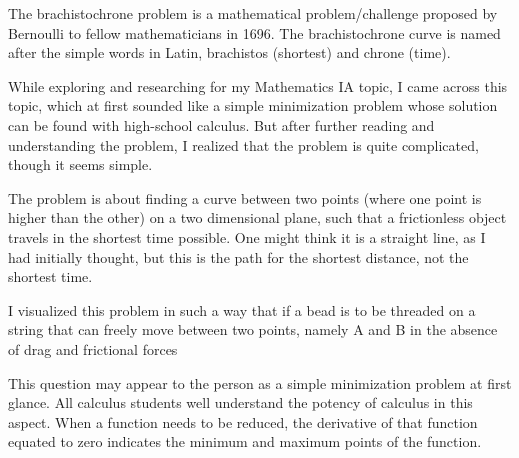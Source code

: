 



{The brachistochrone problem is a mathematical problem/challenge proposed by Bernoulli to fellow mathematicians in 1696. The brachistochrone curve is named after the simple words in Latin, brachistos (shortest) and chrone (time).}

{While exploring and researching for my Mathematics IA topic, I came across this topic, which at first sounded like a simple minimization problem whose solution can be found with high-school calculus. But after further reading and understanding the problem, I realized that the problem is quite complicated, though it seems simple.}

{The problem is about finding a curve between two points (where one point is higher than the other) on a two dimensional plane, such that a frictionless object travels in the shortest time possible. One might think it is a straight line, as I had initially thought, but this is the path for the shortest distance, not the shortest time.}

{I visualized this problem in such a way that if a bead is to be threaded on a string that can freely move between two points, namely A and B in the absence of drag and frictional forces}

{This question may appear to the person as a simple minimization problem at first glance. All calculus students well understand the potency of calculus in this aspect. When a function needs to be reduced, the derivative of that function equated to zero indicates the minimum and maximum points of the function.}


